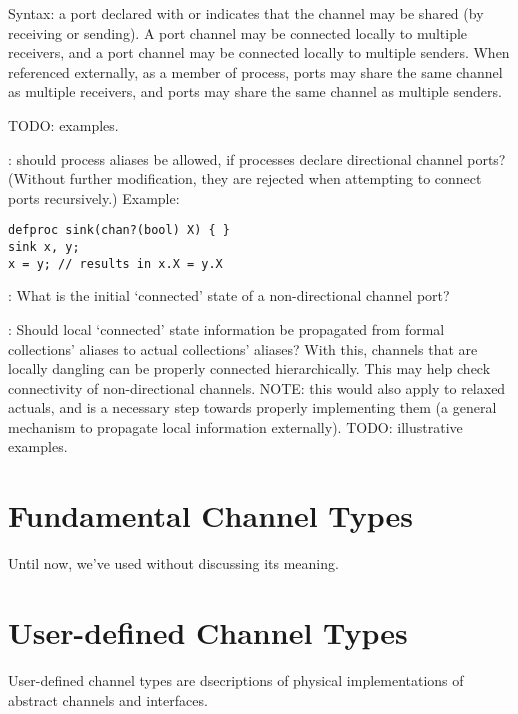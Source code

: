 Syntax: a port declared with  or \ttt{!!} indicates that
the channel may be shared (by receiving or sending).  
A  port channel may be connected locally to multiple receivers, 
and a \ttt{!!} port channel may be connected locally to multiple senders.  
When referenced externally, as a member of process, 
 ports may share the same channel as multiple receivers, and 
\ttt{!!} ports may share the same channel as multiple senders.  

TODO: examples.  

: should process aliases be allowed, 
if processes declare directional channel ports?
(Without further modification, they are rejected when attempting to 
connect ports recursively.)
Example:

\begin{verbatim}
defproc sink(chan?(bool) X) { }
sink x, y;
x = y; // results in x.X = y.X
\end{verbatim}

: What is the initial `connected' state of a non-directional
channel port?

: Should local `connected' state information be propagated
from formal collections' aliases to actual collections' aliases?
With this, channels that are locally dangling can be properly connected
hierarchically.  
This may help check connectivity of non-directional channels.  
NOTE: this would also apply to relaxed actuals, and is a necessary step
towards properly implementing them (a general mechanism to propagate
local information externally).  
TODO: illustrative examples.  

\section{Fundamental Channel Types}
\label{sec:channels:fundamental}

Until now, we've used  without discussing its meaning.  


\section{User-defined Channel Types}
\label{sec:channels:userdef}

User-defined channel types are dsecriptions of physical implementations
of abstract channels and interfaces.  

